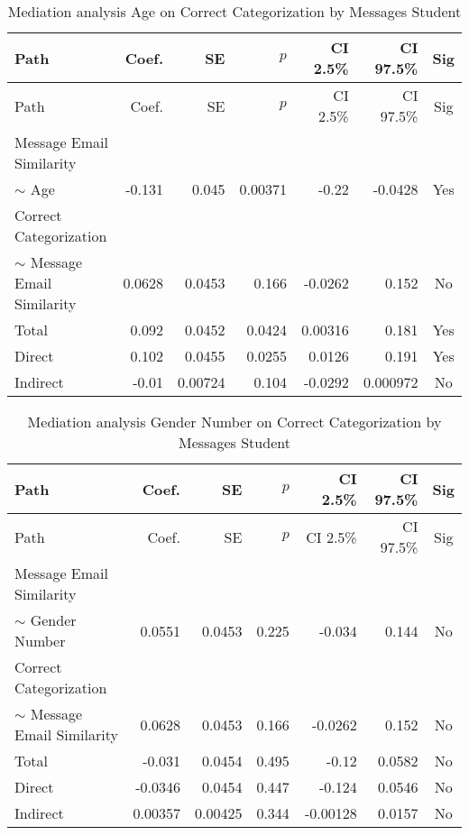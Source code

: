 \begin{longtable}{lrrrrrc}
            \caption{Mediation analysis Age on Correct Categorization by  Messages Student}\label{tab:mediation Age on Correct Categorization by  Messages Student}\\
            \toprule
            Path & Coef. & SE & $p$ & CI 2.5\% & CI 97.5\% & Sig \\
            \midrule
            \endfirsthead
            \toprule
            Path & Coef. & SE & $p$ & CI 2.5\% & CI 97.5\% & Sig \\
            \midrule
            \endhead
            \bottomrule
            \endfoot
            Message Email Similarity\\ $\sim$ Age & -0.131 & 0.045 & 0.00371 & -0.22 & -0.0428 & Yes \\
Correct Categorization\\ $\sim$ Message Email Similarity & 0.0628 & 0.0453 & 0.166 & -0.0262 & 0.152 & No \\
Total & 0.092 & 0.0452 & 0.0424 & 0.00316 & 0.181 & Yes \\
Direct & 0.102 & 0.0455 & 0.0255 & 0.0126 & 0.191 & Yes \\
Indirect & -0.01 & 0.00724 & 0.104 & -0.0292 & 0.000972 & No \\
\end{longtable}

\begin{longtable}{lrrrrrc}
            \caption{Mediation analysis Gender Number on Correct Categorization by  Messages Student}\label{tab:mediation Gender Number on Correct Categorization by  Messages Student}\\
            \toprule
            Path & Coef. & SE & $p$ & CI 2.5\% & CI 97.5\% & Sig \\
            \midrule
            \endfirsthead
            \toprule
            Path & Coef. & SE & $p$ & CI 2.5\% & CI 97.5\% & Sig \\
            \midrule
            \endhead
            \bottomrule
            \endfoot
            Message Email Similarity\\ $\sim$ Gender Number & 0.0551 & 0.0453 & 0.225 & -0.034 & 0.144 & No \\
Correct Categorization\\ $\sim$ Message Email Similarity & 0.0628 & 0.0453 & 0.166 & -0.0262 & 0.152 & No \\
Total & -0.031 & 0.0454 & 0.495 & -0.12 & 0.0582 & No \\
Direct & -0.0346 & 0.0454 & 0.447 & -0.124 & 0.0546 & No \\
Indirect & 0.00357 & 0.00425 & 0.344 & -0.00128 & 0.0157 & No \\
\end{longtable}

